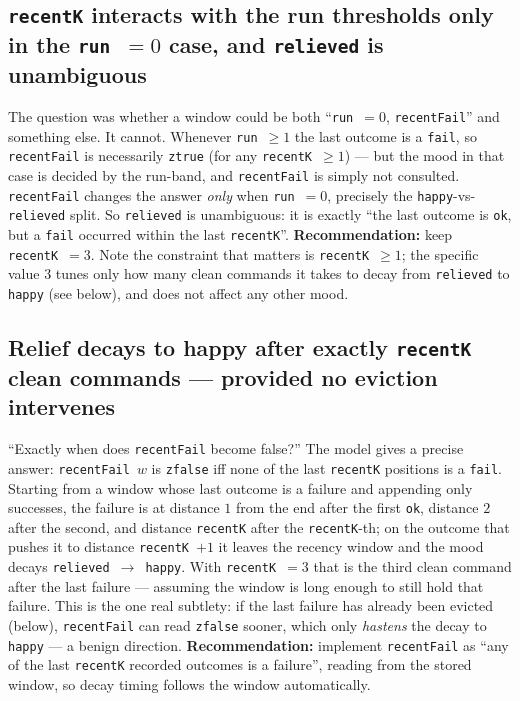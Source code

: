 \documentclass[a4paper,10pt,fleqn]{article}
\begin{document}
\subsection{\texttt{recentK} interacts with the run thresholds only in the
\texttt{run}~$=0$ case, and \texttt{relieved} is unambiguous}
\label{find:kinteract}

The question was whether a window could be both ``\texttt{run}~$=0$,
\texttt{recentFail}'' and something else. It cannot. Whenever
\texttt{run}~$\geq 1$ the last outcome is a \texttt{fail}, so \texttt{recentFail}
is necessarily \texttt{ztrue} (for any \texttt{recentK}~$\geq 1$) --- but the mood
in that case is decided by the run-band, and \texttt{recentFail} is simply not
consulted. \texttt{recentFail} changes the answer \emph{only} when
\texttt{run}~$=0$, precisely the \texttt{happy}-vs-\texttt{relieved} split. So
\texttt{relieved} is unambiguous: it is exactly ``the last outcome is
\texttt{ok}, but a \texttt{fail} occurred within the last \texttt{recentK}''.
\textbf{Recommendation:} keep \texttt{recentK}~$=3$. Note the constraint that
matters is \texttt{recentK}~$\geq 1$; the specific value $3$ tunes only how many
clean commands it takes to decay from \texttt{relieved} to \texttt{happy} (see
below), and does not affect any other mood.

\subsection{Relief decays to happy after exactly \texttt{recentK} clean commands
--- provided no eviction intervenes}
\label{find:decay}

``Exactly when does \texttt{recentFail} become false?'' The model gives a precise
answer: \texttt{recentFail}~$w$ is \texttt{zfalse} iff none of the last
\texttt{recentK} positions is a \texttt{fail}. Starting from a window whose last
outcome is a failure and appending only successes, the failure is at distance $1$
from the end after the first \texttt{ok}, distance $2$ after the second, and
distance \texttt{recentK} after the \texttt{recentK}-th; on the outcome that
pushes it to distance \texttt{recentK}~$+1$ it leaves the recency window and the
mood decays \texttt{relieved}~$\to$~\texttt{happy}. With \texttt{recentK}~$=3$
that is the third clean command after the last failure --- assuming the window is
long enough to still hold that failure. This is the one real subtlety: if the
last failure has already been evicted (below), \texttt{recentFail} can read
\texttt{zfalse} sooner, which only \emph{hastens} the decay to \texttt{happy} ---
a benign direction. \textbf{Recommendation:} implement \texttt{recentFail} as
``any of the last \texttt{recentK} recorded outcomes is a failure'', reading from
the stored window, so decay timing follows the window automatically.
\end{document}
